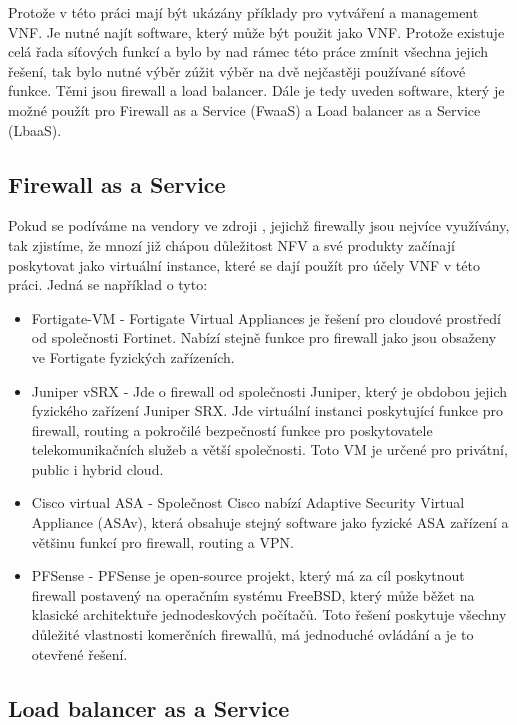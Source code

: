 Protože v této práci mají být ukázány příklady pro vytváření a management VNF. Je nutné najít software, který může být použit jako VNF. Protože existuje celá řada síťových funkcí a bylo by nad rámec této práce zmínit všechna jejich řešení, tak bylo nutné výběr zúžit výběr na dvě nejčastěji používané síťové funkce. Těmi jsou firewall a load balancer. Dále je tedy uveden software, který je možné použít pro Firewall as a Service (FwaaS) a Load balancer as a Service (LbaaS).

\subsection{Firewall as a Service}

Pokud se podíváme na vendory ve zdroji \cite{firewalls} , jejichž firewally jsou nejvíce využívány, tak zjistíme, že mnozí již chápou důležitost NFV a své produkty začínají poskytovat jako virtuální instance, které se dají použít pro účely VNF v této práci. Jedná se například o tyto:

\begin{itemize}
\item Fortigate-VM - Fortigate Virtual Appliances je řešení pro cloudové prostředí od společnosti Fortinet. Nabízí stejně funkce pro firewall jako jsou obsaženy ve Fortigate fyzických zařízeních. \cite{fortigate}
\item Juniper vSRX - Jde o firewall od společnosti Juniper, který je obdobou jejich fyzického zařízení Juniper SRX. Jde virtuální instanci poskytující funkce pro firewall, routing a pokročilé bezpečností funkce pro poskytovatele telekomunikačních služeb a větší společnosti. Toto VM je určené pro privátní, public i hybrid cloud. \cite{juniper}
\item Cisco virtual ASA - Společnost Cisco nabízí Adaptive Security Virtual Appliance (ASAv), která obsahuje stejný software jako fyzické ASA zařízení a většinu funkcí pro firewall, routing a VPN. \cite{cisco}
\item PFSense - PFSense je open-source projekt, který má za cíl poskytnout firewall postavený na operačním systému FreeBSD, který může běžet na klasické architektuře jednodeskových počítačů. Toto řešení poskytuje všechny důležité vlastnosti komerčních firewallů, má jednoduché ovládání a je to otevřené řešení. \cite{pfsense}
\end{itemize} 

\subsection{Load balancer as a Service}

